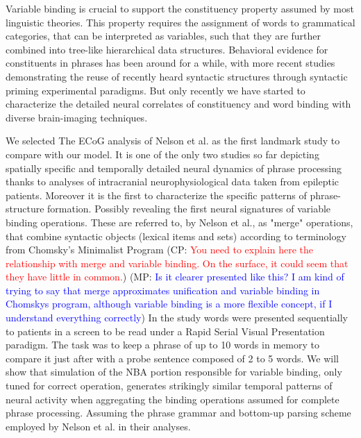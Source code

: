 \documentclass[10pt]{article}
\newcommand{\noteCP}[1]{(CP: \textcolor{red}{#1})}
\newcommand{\noteMP}[2]{(MP: \textcolor{blue}{#1})}
\begin{document}
{\label{729344}}

Variable binding is crucial to support the constituency property assumed by most linguistic theories.
This property requires the assignment of words to grammatical categories, that can be interpreted as variables, such that they are further combined into tree-like hierarchical data structures.
Behavioral evidence for constituents in phrases has been around for a while\cite{bever1969underlying, abrams1969syntactic}, with more recent studies demonstrating the reuse of recently heard syntactic structures through syntactic priming experimental paradigms\cite{bock2007persistent, branigan2000syntactic}.
But only recently we have started to characterize the detailed neural correlates of constituency and word binding with diverse brain-imaging techniques\cite{Nelson_2017, fedorenko2016neural, brennan2016abstract, ding2016cortical, bemis2012basic, Pallier_2011, bastiaansen2010syntactic, longe2006grammatical}.

We selected The ECoG analysis of Nelson et al.\cite{Nelson_2017} as the first landmark study to compare with our model.
It is one of the only two studies so far depicting spatially specific and temporally detailed neural dynamics of phrase processing thanks to analyses of intracranial neurophysiological data taken from epileptic patients.
Moreover it is the first to characterize the specific patterns of phrase-structure formation. Possibly revealing the first neural signatures of variable binding operations. These are referred to, by Nelson et al., as "merge" operations, that combine syntactic objects (lexical items and sets) according to terminology from Chomsky’s Minimalist Program\cite{Chomsky_2013}
\noteCP{You need to explain here the relationship with merge and variable binding. On the surface, it could seem that they have little in common.}
\noteMP{Is it clearer presented like this? I am kind of trying to say that merge approximates unification and variable binding in Chomskys program, although variable binding is a more flexible concept, if I understand everything correctly}.
In the study words were presented sequentially to patients in a screen to be read under a Rapid Serial Visual Presentation paradigm.
The task was to keep a phrase of up to 10 words in memory to compare it just after with a probe sentence composed of 2 to 5 words.
We will show that simulation of the NBA portion responsible for variable binding, only tuned for correct operation, generates strikingly similar temporal patterns of neural activity when aggregating the binding operations assumed for complete phrase processing.
Assuming the phrase grammar and bottom-up parsing scheme employed by Nelson et al. in their analyses.
\end{document}

